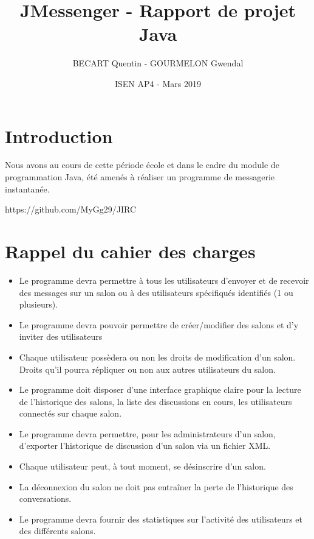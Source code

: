 \documentclass[11pt]{article}
\begin{document}
    \title{JMessenger - Rapport de projet Java}
    \author{BECART Quentin - GOURMELON Gwendal}
    \date{ISEN AP4 - Mars 2019}


    \maketitle

    \section{Introduction}
    Nous avons au cours de cette période école et dans le cadre du module de programmation Java, été amenés à réaliser un programme de messagerie instantanée.\newline
    \centerline{https://github.com/MyGg29/JIRC}
    \section{Rappel du cahier des charges}
    \begin{itemize}
        \item Le programme devra permettre à tous les utilisateurs d’envoyer et de recevoir des messages sur un salon ou à des utilisateurs spéciﬁqués identiﬁés (1 ou plusieurs).
        \item Le programme devra pouvoir permettre de créer/modiﬁer des salons et d’y inviter des utilisateurs
        \item Chaque utilisateur possèdera ou non les droits de modiﬁcation d’un salon. Droits qu’il pourra répliquer ou non aux autres utilisateurs du salon.
        \item Le programme doit disposer d’une interface graphique claire pour la lecture de l’historique des salons, la liste des discussions en cours, les utilisateurs connectés sur chaque salon.
        \item Le programme devra permettre, pour les administrateurs d’un salon, d’exporter l’historique de discussion d’un salon via un ﬁchier XML.
        \item Chaque utilisateur peut, à tout moment, se désinscrire d’un salon.
        \item La déconnexion du salon ne doit pas entraîner la perte de l’historique des conversations.
        \item Le programme devra fournir des statistiques sur l’activité des utilisateurs et des diﬀérents salons.
    \end{itemize}
\end{document}
